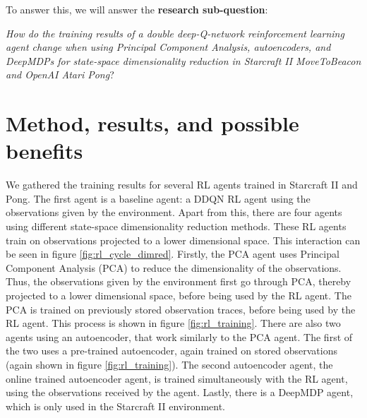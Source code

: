\noindent To answer this, we will answer the \textbf{research sub-question}:\newline

\noindent \textit{How do the training results of a double deep-Q-network reinforcement learning agent change when using Principal Component Analysis, autoencoders, and DeepMDPs for state-space dimensionality reduction in Starcraft II MoveToBeacon and OpenAI Atari Pong}?

\section{Method, results, and possible benefits}
We gathered the training results for several RL agents trained in Starcraft II and Pong. The first agent is a baseline agent: a DDQN RL agent using the observations given by the environment. Apart from this, there are four agents using different state-space dimensionality reduction methods. These RL agents train on observations projected to a lower dimensional space. This interaction can be seen in figure \ref{fig:rl_cycle_dimred}. Firstly, the PCA agent uses Principal Component Analysis (PCA) to reduce the dimensionality of the observations. Thus, the observations given by the environment first go through PCA, thereby projected to a lower dimensional space, before being used by the RL agent. The PCA is trained on previously stored observation traces, before being used by the RL agent. This process is shown in figure \ref{fig:rl_training}. There are also two agents using an autoencoder, that work similarly to the PCA agent. The first of the two uses a pre-trained autoencoder, again trained on stored observations (again shown in figure \ref{fig:rl_training}). The second autoencoder agent, the online trained autoencoder agent, is trained simultaneously with the RL agent, using the observations received by the agent. Lastly, there is a DeepMDP agent, which is only used in the Starcraft II environment.

